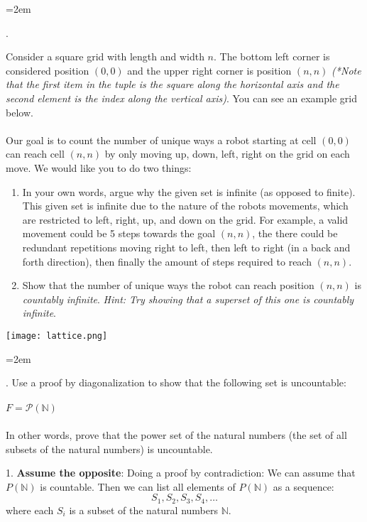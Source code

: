 \documentclass[12pt]{article}
\newcounter{quesnum}
\newcommand{\question}[2][??]{
\begin{list}{\labelitemi}{\leftmargin=2em}
\item [\arabic{quesnum}.] {} {#2}
\end{list}
\addtocounter{quesnum}{1}
}
\begin{document}
\vspace{12pt}



\question[3]{
Consider a square grid with length and width $n$. The bottom left corner is considered position $(0,0)$ and the upper right corner is position $(n,n)$ \emph{(*Note that the first item in the tuple is the square along the horizontal axis and the second element is the index along the vertical axis)}. You can see an example grid below.\\
\\
Our goal is to count the number of unique ways a robot starting at cell $(0,0)$ can reach cell $(n,n)$ by only moving up, down, left, right on the grid on each move. We would like you to do two things:

\begin{enumerate}
	\item In your own words, argue why the given set is infinite (as opposed to finite). This given set is infinite due to the nature of the robots movements, which are restricted to left, right, up, and down on the grid. For example, a valid movement could be 5 steps towards the goal $(n,n)$, the there could be redundant repetitions moving right to left, then left to right (in a back and forth direction), then finally the amount of steps required to reach $(n,n)$. 
	\item Show that the number of unique ways the robot can reach position $(n,n)$ is \emph{countably infinite}. \emph{Hint: Try showing that a superset of this one is countably infinite}.
\end{enumerate}
}

\texttt{[image: lattice.png]}

\vspace{12pt}

\question[3]{
Use a proof by diagonalization to show that the following set is uncountable:\\
\\
$F= \mathcal{P}(\mathbb{N}) $
\\
\\
In other words, prove that the power set of the natural numbers (the set of all subsets of the natural numbers) is uncountable.
}

1. \textbf{Assume the opposite}: Doing a proof by contradiction: We can assume that \( P(\mathbb{N}) \) is countable. Then we can list all elements of \( P(\mathbb{N}) \)  as a sequence:
   \[
   S_1, S_2, S_3, S_4, \dots
   \]
   where each \( S_i \) is a subset of the natural numbers \( \mathbb{N} \).\newline
\end{document}
